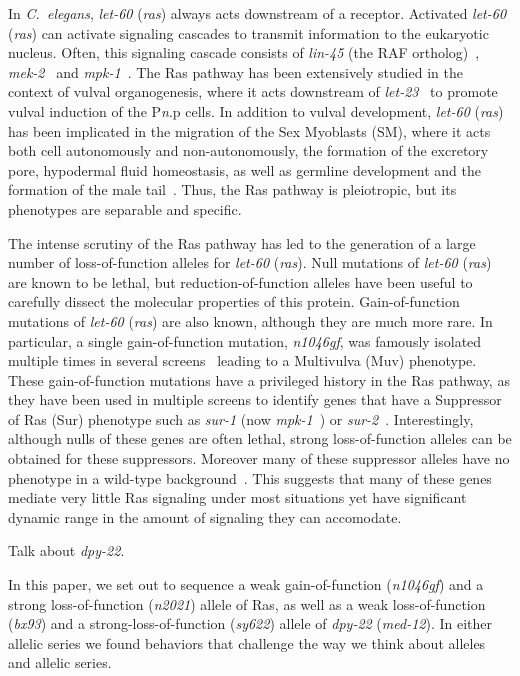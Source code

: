 \documentclass[10pt, onecolumn]{article}
\newcommand{\cel}{\emph{C.~elegans}}
\newcommand{\gene}[1]{\mbox{\emph{#1}}}
\newcommand{\ras}{\gene{let-60} (\emph{ras})}
\newcommand{\dpy}{\gene{dpy-22} (\emph{med-12})}
\begin{document}
In \cel{}, \ras{} always acts downstream of a receptor. Activated
\ras{} can activate signaling cascades to transmit information to the eukaryotic
nucleus. Often, this signaling cascade consists of \gene{lin-45} (the RAF
ortholog)~\cite{Han1993a}, \gene{mek-2}~\cite{Wu1995} and
\gene{mpk-1}~\cite{Lackner1994}. The Ras pathway has been extensively studied in
the context of vulval organogenesis, where it acts downstream of
\gene{let-23}~\cite{Sternberg1995} to promote vulval induction of the
P\emph{n}.p cells. In addition to vulval development, \ras{} has been implicated
in the migration of the Sex Myoblasts (SM), where it acts both cell autonomously
and non-autonomously, the formation of the excretory pore, hypodermal fluid
homeostasis, as well as germline development and the formation of the male
tail~\cite{Sundaram2006}. Thus, the Ras pathway is pleiotropic, but its
phenotypes are separable and specific.

The intense scrutiny of the Ras pathway has led to the generation of a large
number of loss-of-function alleles for \ras{}. Null mutations of \ras{} are
known to be lethal, but reduction-of-function alleles have been useful to
carefully dissect the molecular properties of this protein. Gain-of-function
mutations of \ras{} are also known, although they are much more rare. In
particular, a single gain-of-function mutation, \emph{n1046gf}, was famously
isolated multiple times in several
screens~\cite{Han1990,Beitel1990a,Ferguson1985} leading to a Multivulva (Muv)
phenotype.  These
gain-of-function mutations have a privileged history in the Ras pathway, as they
have been used in multiple screens to identify genes that have a Suppressor of
Ras (Sur) phenotype  such as
\gene{sur-1} (now \gene{mpk-1}~\cite{Lackner1994}) or
\gene{sur-2}~\cite{Singh1995}. Interestingly, although nulls of these genes are
often lethal, strong loss-of-function alleles can be obtained for these
suppressors. Moreover many of these suppressor alleles have no phenotype in a
wild-type background~\cite{}. This suggests that many of these genes mediate
very little Ras signaling under most situations yet have significant dynamic
range in the amount of signaling they can accomodate.

Talk about \gene{dpy-22}.

In this paper, we set out to sequence a weak gain-of-function (\emph{n1046gf})
and a strong loss-of-function (\emph{n2021}) allele of Ras, as well as a weak
loss-of-function (\emph{bx93}) and a strong-loss-of-function (\emph{sy622})
allele of \dpy{}. In either allelic series we found behaviors that challenge the
way we think about alleles and allelic series.
\end{document}
